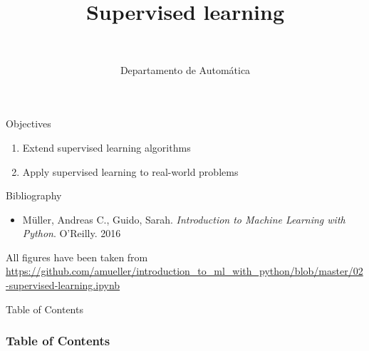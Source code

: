 \documentclass[10pt,compress]{beamer} %
\title[Supervised learning]{Supervised learning}
\author{\asignatura\\\carrera}
\institute{}
\date{Departamento de Automática}
\begin{document}
{\titlepageBlue
    \begin{frame}
        \titlepage
    \end{frame}
}

\institute{\asignatura}

\begin{frame}[plain]{}
   \begin{block}{Objectives}
      \begin{enumerate}
         \item Extend supervised learning algorithms
         \item Apply supervised learning to real-world problems
      \end{enumerate} 
   \end{block}

   \begin{block}{Bibliography}
    \begin{itemize}
        \item M\"uller, Andreas C., Guido, Sarah. \textit{Introduction to Machine Learning with Python}. O'Reilly. 2016
    \end{itemize}
   \end{block}
   All figures have been taken from \url{https://github.com/amueller/introduction_to_ml_with_python/blob/master/02-supervised-learning.ipynb}
\end{frame}

{
\begin{frame}[shrink]{Table of Contents}

 	\frametitle{Table of Contents}
  	\begin{multicols}{2}
  		\tableofcontents
    \end{multicols}

\end{frame}
}
\end{document}
